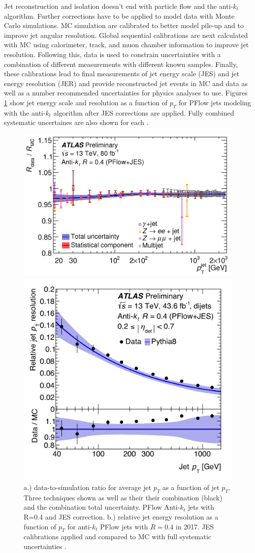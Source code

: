 Jet reconstruction and isolation doesn't end with particle flow and the anti-$k_t$ algorithm. Further corrections have to be applied to model data with Monte Carlo simulations. MC simulation are calibrated to better model pile-up and to improve jet angular resolution. Global sequential calibrations are next calculated with MC using calorimeter, track, and muon chamber information to improve jet resolution. Following this, data is used to constrain uncertainties with a combination of different measurements with different known samples. Finally, these calibrations lead to final measurements of jet energy scale (JES) and jet energy resolution (JER) and provide reconstructed jet events in MC and data as well as a number recommended uncertainties for physics analyses to use.  Figures \ref{fig:ScaleRes} show jet energy scale and resolution as a function of $p_T$ for PFlow jets modeling with the anti-$k_t$ algorithm after JES corrections are applied. Fully combined systematic uncertaines are also shown for each \cite{jetscaleres}.

\begin{figure}[!h]
    \centering
  \begin{minipage}[b]{0.5\textwidth}
  \includegraphics[width=.5\textwidth]{Pictures/ParticleFlowScale.png}
  \end{minipage}
  \hspace{.5cm}
  \begin{minipage}[b]{0.4\textwidth}
    \includegraphics[width=.4\textwidth]{Pictures/ParticleFlowResolution.png}
  \end{minipage}
    \caption{ a.) data-to-simulation ratio for average jet $p_T$ as a function of jet $p_T$. Three techniques shown as well as their their combination (black) and the combination total uncertainty. PFlow Anti-$k_t$ jets with R=0.4 and JES correction. b.) relative jet energy resolution as a function of $p_T$ for anti-$k_t$ PFlow jets with $R=0.4$ in 2017. JES calibrations applied and compared to MC with full systematic uncertainties \cite{JETEtmiss}.}
    \label{fig:ScaleRes}
\end{figure}

